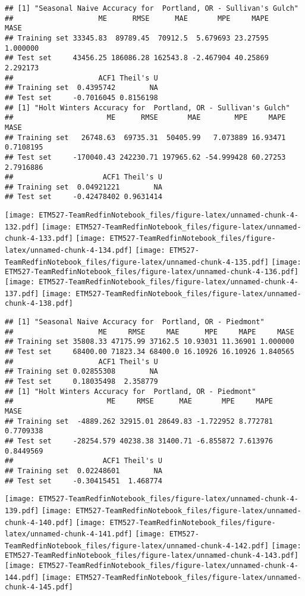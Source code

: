 \documentclass[]{article}
\begin{document}
\begin{verbatim}
## [1] "Seasonal Naive Accuracy for  Portland, OR - Sullivan's Gulch"
##                    ME      RMSE      MAE       MPE     MAPE     MASE
## Training set 33345.83  89789.45  70912.5  5.679693 23.27595 1.000000
## Test set     43456.25 186086.28 162543.8 -2.467904 40.25869 2.292173
##                    ACF1 Theil's U
## Training set  0.4395742        NA
## Test set     -0.7016045 0.8156198
## [1] "Holt Winters Accuracy for  Portland, OR - Sullivan's Gulch"
##                      ME      RMSE       MAE        MPE     MAPE      MASE
## Training set   26748.63  69735.31  50405.99   7.073889 16.93471 0.7108195
## Test set     -170040.43 242230.71 197965.62 -54.999428 60.27253 2.7916886
##                     ACF1 Theil's U
## Training set  0.04921221        NA
## Test set     -0.42478402 0.9631414
\end{verbatim}

\texttt{[image: ETM527-TeamRedfinNotebook\_files/figure-latex/unnamed-chunk-4-132.pdf]}
\texttt{[image: ETM527-TeamRedfinNotebook\_files/figure-latex/unnamed-chunk-4-133.pdf]}
\texttt{[image: ETM527-TeamRedfinNotebook\_files/figure-latex/unnamed-chunk-4-134.pdf]}
\texttt{[image: ETM527-TeamRedfinNotebook\_files/figure-latex/unnamed-chunk-4-135.pdf]}
\texttt{[image: ETM527-TeamRedfinNotebook\_files/figure-latex/unnamed-chunk-4-136.pdf]}
\texttt{[image: ETM527-TeamRedfinNotebook\_files/figure-latex/unnamed-chunk-4-137.pdf]}
\texttt{[image: ETM527-TeamRedfinNotebook\_files/figure-latex/unnamed-chunk-4-138.pdf]}

\begin{verbatim}
## [1] "Seasonal Naive Accuracy for  Portland, OR - Piedmont"
##                    ME     RMSE     MAE      MPE     MAPE     MASE
## Training set 35808.33 47175.99 37162.5 10.93031 11.36901 1.000000
## Test set     68400.00 71823.34 68400.0 16.10926 16.10926 1.840565
##                    ACF1 Theil's U
## Training set 0.02855308        NA
## Test set     0.18035498  2.358779
## [1] "Holt Winters Accuracy for  Portland, OR - Piedmont"
##                      ME     RMSE      MAE       MPE     MAPE      MASE
## Training set  -4889.262 32915.01 28649.83 -1.722952 8.772781 0.7709338
## Test set     -28254.579 40238.38 31400.71 -6.855872 7.613976 0.8449569
##                     ACF1 Theil's U
## Training set  0.02248601        NA
## Test set     -0.30415451  1.468774
\end{verbatim}

\texttt{[image: ETM527-TeamRedfinNotebook\_files/figure-latex/unnamed-chunk-4-139.pdf]}
\texttt{[image: ETM527-TeamRedfinNotebook\_files/figure-latex/unnamed-chunk-4-140.pdf]}
\texttt{[image: ETM527-TeamRedfinNotebook\_files/figure-latex/unnamed-chunk-4-141.pdf]}
\texttt{[image: ETM527-TeamRedfinNotebook\_files/figure-latex/unnamed-chunk-4-142.pdf]}
\texttt{[image: ETM527-TeamRedfinNotebook\_files/figure-latex/unnamed-chunk-4-143.pdf]}
\texttt{[image: ETM527-TeamRedfinNotebook\_files/figure-latex/unnamed-chunk-4-144.pdf]}
\texttt{[image: ETM527-TeamRedfinNotebook\_files/figure-latex/unnamed-chunk-4-145.pdf]}
\end{document}
